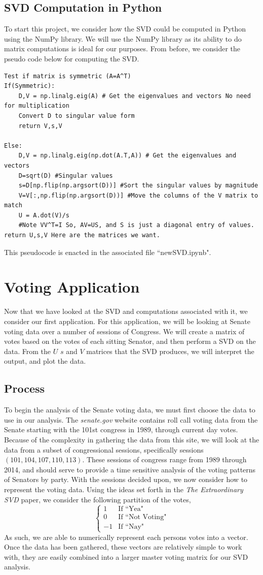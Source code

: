 \documentclass[letterpaper,12pt]{article}
\begin{document}
\subsection{SVD Computation in Python}
To start this project, we consider how the SVD could be computed in Python using the NumPy library. We will use the NumPy library as its ability to do matrix computations is ideal for our purposes. From before, we consider the pseudo code below for computing the SVD.
\begin{verbatim}
Test if matrix is symmetric (A=A^T)
If(Symmetric):
    D,V = np.linalg.eig(A) # Get the eigenvalues and vectors No need for multiplication
    Convert D to singular value form
    return V,s,V
	
Else:
    D,V = np.linalg.eig(np.dot(A.T,A)) # Get the eigenvalues and vectors
    D=sqrt(D) #Singular values
    s=D[np.flip(np.argsort(D))] #Sort the singular values by magnitude
    V=V[:,np.flip(np.argsort(D))] #Move the columns of the V matrix to match
    U = A.dot(V)/s 
    #Note VV^T=I So, AV=US, and S is just a diagonal entry of values.
return U,s,V Here are the matrices we want.
\end{verbatim}
This pseudocode is enacted in the associated file ``newSVD.ipynb".
\section{Voting Application}
Now that we have looked at the SVD and computations associated with it, we consider our first application. For this application, we will be looking at Senate voting data over a number of sessions of Congress. We will create a matrix of votes based on the votes of each sitting Senator, and then perform a SVD on the data. From the $U$ $s$ and $V$ matrices that the SVD produces, we will interpret the output, and plot the data.
\subsection{Process}
To begin the analysis of the Senate voting data, we must first choose the data to use in our analysis. The \textit{senate.gov} website contains roll call voting data from the Senate starting with the 101st congress in 1989, through current day votes. Because of the complexity in gathering the data from this site, we will look at the data from a subset of congressional sessions, specifically sessions $(101,104,107,110,113)$. These sessions of congress range from 1989 through 2014, and should serve to provide a time sensitive analysis of the voting patterns of Senators by party.  With the sessions decided upon, we now consider how to represent the voting data. Using the ideas set forth in the \textit{The Extraordinary SVD} paper, we consider the following partition of the votes,
\[\begin{cases}
1 & \text{If ``Yea"}\\
0 & \text{If ``Not Voting"}\\
-1 & \text{If ``Nay"}
\end{cases}\]
As such, we are able to numerically represent each persons votes into a vector. Once the data has been gathered, these vectors are relatively simple to work with, they are easily combined into a larger master voting matrix for our SVD analysis.
\end{document}
